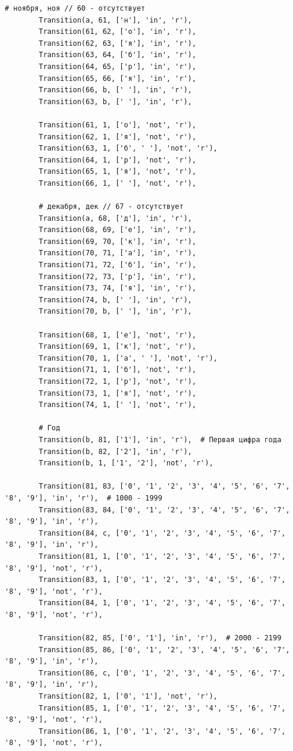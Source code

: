 \documentclass[a4paper, 14pt]{article}
\begin{document}
\begin{lstlisting}[label=some-code,caption=Автомат для поиска даты в текстовом формате]
        # ноября, ноя // 60 - отсутствует
        Transition(a, 61, ['н'], 'in', 'r'),
        Transition(61, 62, ['о'], 'in', 'r'),
        Transition(62, 63, ['я'], 'in', 'r'),
        Transition(63, 64, ['б'], 'in', 'r'),
        Transition(64, 65, ['р'], 'in', 'r'),
        Transition(65, 66, ['я'], 'in', 'r'),
        Transition(66, b, [' '], 'in', 'r'),
        Transition(63, b, [' '], 'in', 'r'),

        Transition(61, 1, ['о'], 'not', 'r'),
        Transition(62, 1, ['я'], 'not', 'r'),
        Transition(63, 1, ['б', ' '], 'not', 'r'),
        Transition(64, 1, ['р'], 'not', 'r'),
        Transition(65, 1, ['я'], 'not', 'r'),
        Transition(66, 1, [' '], 'not', 'r'),

        # декабря, дек // 67 - отсутствует
        Transition(a, 68, ['д'], 'in', 'r'),
        Transition(68, 69, ['е'], 'in', 'r'),
        Transition(69, 70, ['к'], 'in', 'r'),
        Transition(70, 71, ['а'], 'in', 'r'),
        Transition(71, 72, ['б'], 'in', 'r'),
        Transition(72, 73, ['р'], 'in', 'r'),
        Transition(73, 74, ['я'], 'in', 'r'),
        Transition(74, b, [' '], 'in', 'r'),
        Transition(70, b, [' '], 'in', 'r'),

        Transition(68, 1, ['е'], 'not', 'r'),
        Transition(69, 1, ['к'], 'not', 'r'),
        Transition(70, 1, ['а', ' '], 'not', 'r'),
        Transition(71, 1, ['б'], 'not', 'r'),
        Transition(72, 1, ['р'], 'not', 'r'),
        Transition(73, 1, ['я'], 'not', 'r'),
        Transition(74, 1, [' '], 'not', 'r'),

        # Год
        Transition(b, 81, ['1'], 'in', 'r'),  # Первая цифра года
        Transition(b, 82, ['2'], 'in', 'r'),
        Transition(b, 1, ['1', '2'], 'not', 'r'),

        Transition(81, 83, ['0', '1', '2', '3', '4', '5', '6', '7', '8', '9'], 'in', 'r'),  # 1000 - 1999
        Transition(83, 84, ['0', '1', '2', '3', '4', '5', '6', '7', '8', '9'], 'in', 'r'),
        Transition(84, c, ['0', '1', '2', '3', '4', '5', '6', '7', '8', '9'], 'in', 'r'),
        Transition(81, 1, ['0', '1', '2', '3', '4', '5', '6', '7', '8', '9'], 'not', 'r'),
        Transition(83, 1, ['0', '1', '2', '3', '4', '5', '6', '7', '8', '9'], 'not', 'r'),
        Transition(84, 1, ['0', '1', '2', '3', '4', '5', '6', '7', '8', '9'], 'not', 'r'),

        Transition(82, 85, ['0', '1'], 'in', 'r'),  # 2000 - 2199
        Transition(85, 86, ['0', '1', '2', '3', '4', '5', '6', '7', '8', '9'], 'in', 'r'),
        Transition(86, c, ['0', '1', '2', '3', '4', '5', '6', '7', '8', '9'], 'in', 'r'),
        Transition(82, 1, ['0', '1'], 'not', 'r'),
        Transition(85, 1, ['0', '1', '2', '3', '4', '5', '6', '7', '8', '9'], 'not', 'r'),
        Transition(86, 1, ['0', '1', '2', '3', '4', '5', '6', '7', '8', '9'], 'not', 'r'),


\end{lstlisting}
\end{document}
